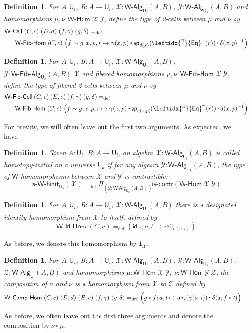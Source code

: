\documentclass[reqno,10pt,a4paper,oneside]{amsart}
\newcommand{\X}{\mathcal{X}}
\newcommand{\Y}{\mathcal{Y}}
\newcommand{\Z}{\mathcal{Z}}
\newcommand{\comp}{\circ}
\newcommand{\idfun}[1]{\mathsf{id}_{#1}}
\newcommand{\prd}[1]{\Pi_{#1}}
\newcommand{\defeq}{=_{\mathrm{def}}}
\newcommand{\refl}{\mathsf{refl}}
\newcommand{\W}{\mathsf{W}}
\newcommand{\funext}{\leftidx{^\Pi}{\mathsf{Eq}}^{=}}
\newcommand{\one}{\mathsf{1}}
\newcommand{\UU}{\mathsf{U}}
\newcommand{\WCell}{\mathsf{W}\text{-}\mathsf{Cell}}
\newcommand{\WFibCell}{\mathsf{W}\text{-}\mathsf{Fib}\text{-}\mathsf{Cell}}
\newcommand{\WAlg}{\mathsf{W}\text{-}\mathsf{Alg}}
\newcommand{\WFibAlg}{\mathsf{W}\text{-}\mathsf{Fib}\text{-}\mathsf{Alg}}
\newcommand{\WHom}{\mathsf{W}\text{-}\mathsf{Hom}}
\newcommand{\WFibHom}{\mathsf{W}\text{-}\mathsf{Fib}\text{-}\mathsf{Hom}}
\newcommand{\IsWHInit}{\mathsf{is}\text{-}\mathsf{\W}\text{-}\mathsf{hinit}}
\newcommand{\app}{\mathsf{ap}}
\newcommand{\iscontr}{\mathsf{is}\text{-}\mathsf{contr}}
\newcommand{\WIdHom}{\mathsf{W}\text{-}\mathsf{Id}\text{-}\mathsf{Hom}}
\newcommand{\WCompHom}{\mathsf{W}\text{-}\mathsf{Comp}\text{-}\mathsf{Hom}}
\newcommand{\ct}{%
  \mathchoice{\mathbin{\raisebox{0.5ex}{$\displaystyle\centerdot$}}}%
             {\mathbin{\raisebox{0.5ex}{$\centerdot$}}}%
             {\mathbin{\raisebox{0.25ex}{$\scriptstyle\,\centerdot\,$}}}%
             {\mathbin{\raisebox{0.1ex}{$\scriptscriptstyle\,\centerdot\,$}}}}
\numberwithin{equation}{section}
\theoremstyle{mythm}
\theoremstyle{mydef}
\newtheorem{definition}[theorem]{Definition}
\theoremstyle{myrmk}
\begin{document}
\begin{definition}\label{def:WCell}
For $A:\UU_i$, $B : A \to \UU_i$, $\X : \WAlg_{\UU_j}(A,B)$, $\Y : \WAlg_{\UU_k}(A,B)$ and homomorphisms $\mu, \nu : \WHom \; \X \; \Y$, define the type of \emph{2-cells} between $\mu$ and $\nu$ by
\begin{align*} & \WCell \; (C,c) \; (D,d) \; (f,\gamma) \; (g,\delta) \defeq \\ & \;\;\; \;\;\;\WFibHom \; (C,c) \; \Big(f \sim g; x,p,r \mapsto \gamma(x,p) \ct \app_{d(x)}(\funext(r)) \ct \delta(x,p)^{-1}\Big)
\end{align*}
\end{definition}

\begin{definition}\label{def:WFibCell}
For $A:\UU_i$, $B : A \to \UU_i$, $\X : \WAlg_{\UU_j}(A,B)$, $\Y : \WFibAlg_{\UU_k}(A,B) \; \X$ and fibered homomorphisms $\mu, \nu : \WFibHom \; \X \; \Y$, define the type of \emph{fibered 2-cells} between $\mu$ and $\nu$ by
\begin{align*} & \WFibCell \; (C,c) \; (E, e) \; (f,\gamma) \; (g,\delta) \defeq \\ & \;\;\; \;\;\;\WFibHom \; (C,c) \; \Big(f \sim g; x,p,r \mapsto \gamma(x,p) \ct \app_{e(x,p)}(\funext(r)) \ct \delta(x,p)^{-1}\Big)
\end{align*}
\end{definition}
For brevity, we will often leave out the first two arguments. As expected, we have:
\begin{definition}\label{def:WHInit}
Given $A:\UU_i$, $B : A \to \UU_i$, an algebra $\X : \WAlg_{\UU_j}(A,B)$ is called \emph{homotopy-initial} on a universe $\UU_k$ if for any algebra $\Y : \WAlg_{\UU_k}(A,B)$, the type of $\W$-homomorphisms between $\X$ and $\Y$ is contractible:
\[ \IsWHInit_{\UU_k}(\X) \defeq \prd{(\Y:\WAlg_{\UU_k}(A,B))} \iscontr(\WHom \; \X \; \Y) \]  
\end{definition}

\begin{definition}
For $A:\UU_i$, $B : A \to \UU_i$, $\X : \WAlg_{\UU_j}(A,B)$ there is a designated \emph{identity} homomorphism from $\X$ to itself, defined by
\[ \WIdHom \; (C,c) \defeq (\idfun{C}; a,t \mapsto \refl_{c(a,t)}) \]
\end{definition}
As before, we denote this homomorphism by $\one_\X$.

\begin{definition}
For $A:\UU_i$, $B : A \to \UU_i$, $\X : \WAlg_{\UU_j}(A,B)$, $\Y : \WAlg_{\UU_k}(A,B)$, $\Z : \WAlg_{\UU_l}(A,B)$ and homomorphisms $\mu : \WHom \; \X \; \Y$, $\nu : \WHom \; \Y \; \Z$, the \emph{composition} of $\mu$ and $\nu$ is a homomorphism from $\X$ to $\Z$ defined by
\begin{align*} & \WCompHom \; (C,c) \; (D,d) \; (E,e) \; (f,\gamma) \; (g,\delta) \defeq  \Big(g \comp f; a,t \mapsto \app_g(\gamma(a,t)) \ct \delta(a, f \comp t) \Big)
\end{align*}
\end{definition}
As before, we often leave out the first three arguments and denote the composition by $\nu \comp \mu$.
\end{document}
